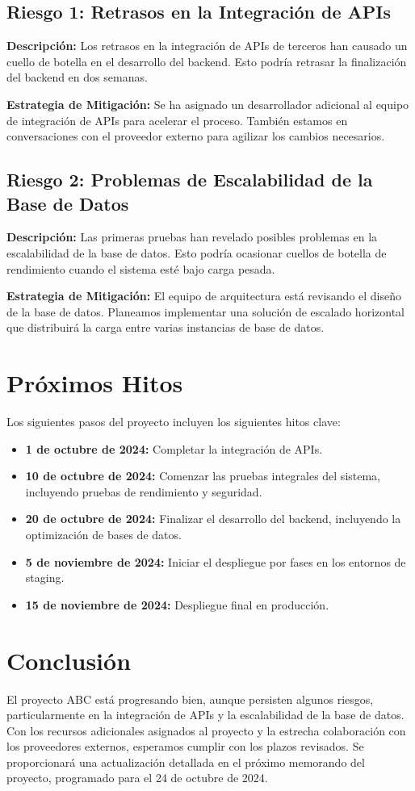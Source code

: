 \documentclass[12pt]{article}
\begin{document}
\subsection{Riesgo 1: Retrasos en la Integración de APIs}
\textbf{Descripción:} Los retrasos en la integración de APIs de terceros han causado un cuello de botella en el desarrollo del backend. Esto podría retrasar la finalización del backend en dos semanas.

\textbf{Estrategia de Mitigación:} Se ha asignado un desarrollador adicional al equipo de integración de APIs para acelerar el proceso. También estamos en conversaciones con el proveedor externo para agilizar los cambios necesarios.

\subsection{Riesgo 2: Problemas de Escalabilidad de la Base de Datos}
\textbf{Descripción:} Las primeras pruebas han revelado posibles problemas en la escalabilidad de la base de datos. Esto podría ocasionar cuellos de botella de rendimiento cuando el sistema esté bajo carga pesada.

\textbf{Estrategia de Mitigación:} El equipo de arquitectura está revisando el diseño de la base de datos. Planeamos implementar una solución de escalado horizontal que distribuirá la carga entre varias instancias de base de datos.

\section{Próximos Hitos}
Los siguientes pasos del proyecto incluyen los siguientes hitos clave:

\begin{itemize}
    \item \textbf{1 de octubre de 2024:} Completar la integración de APIs.
    \item \textbf{10 de octubre de 2024:} Comenzar las pruebas integrales del sistema, incluyendo pruebas de rendimiento y seguridad.
    \item \textbf{20 de octubre de 2024:} Finalizar el desarrollo del backend, incluyendo la optimización de bases de datos.
    \item \textbf{5 de noviembre de 2024:} Iniciar el despliegue por fases en los entornos de staging.
    \item \textbf{15 de noviembre de 2024:} Despliegue final en producción.
\end{itemize}

\section{Conclusión}
El proyecto ABC está progresando bien, aunque persisten algunos riesgos, particularmente en la integración de APIs y la escalabilidad de la base de datos. Con los recursos adicionales asignados al proyecto y la estrecha colaboración con los proveedores externos, esperamos cumplir con los plazos revisados. Se proporcionará una actualización detallada en el próximo memorando del proyecto, programado para el 24 de octubre de 2024.
\end{document}

